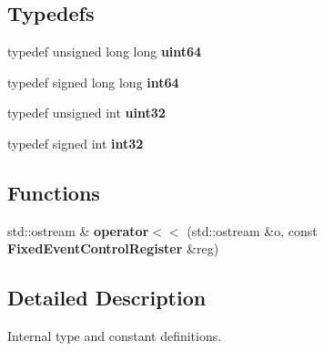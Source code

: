 \subsection*{Typedefs}
\begin{DoxyCompactItemize}
\item 
typedef unsigned long long {\bfseries uint64}\label{types_8h_a29940ae63ec06c9998bba873e25407ad}

\item 
typedef signed long long {\bfseries int64}\label{types_8h_a87dc1c46a17e3ee6037afdb6aef76632}

\item 
typedef unsigned int {\bfseries uint32}\label{types_8h_a1134b580f8da4de94ca6b1de4d37975e}

\item 
typedef signed int {\bfseries int32}\label{types_8h_a43d43196463bde49cb067f5c20ab8481}

\end{DoxyCompactItemize}
\subsection*{Functions}
\begin{DoxyCompactItemize}
\item 
std\+::ostream \& {\bfseries operator$<$$<$} (std\+::ostream \&o, const {\bf Fixed\+Event\+Control\+Register} \&reg)\label{types_8h_ade23d63e7c0dd811d32fe7634735c043}

\end{DoxyCompactItemize}


\subsection{Detailed Description}
Internal type and constant definitions. 

